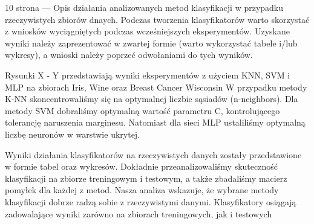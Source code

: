 \documentclass[12pt]{article}
\begin{document}
10 strona --- Opis działania analizowanych metod klasyfikacji w przypadku rzeczywistych zbiorów dnaych. 
Podczas tworzenia klasyfikatorów warto skorzystać z wniosków wyciągniętych podczas wcześniejszych eksperymentów. 
Uzyskane wyniki należy zaprezentować w zwartej formie (warto wykorzystać tabele i/lub wykresy), 
a wnioski należy poprzeć odwołaniami do tych wyników.

Rysunki X - Y przedstawiają wyniki eksperymentów z użyciem KNN, SVM i MLP na zbiorach Iris, Wine oraz Breast Cancer Wisconsin
W przypadku metody K-NN skoncentrowaliśmy się na optymalnej liczbie sąsiadów (n-neighbors). Dla metody SVM dobraliśmy optymalną 
wartość parametru C, kontrolującego tolerancję naruszenia marginesu. Natomiast dla sieci MLP ustaliliśmy optymalną liczbę neuronów 
w warstwie ukrytej.

Wyniki działania klasyfikatorów na rzeczywistych danych zostały przedstawione w formie tabel oraz wykresów. 
Dokładnie przeanalizowaliśmy 
skuteczność klasyfikacji na zbiorze treningowym i testowym, a także zbadaliśmy macierz pomyłek dla każdej z metod. Nasza analiza wskazuje, 
że wybrane metody klasyfikacji dobrze radzą sobie z rzeczywistymi danymi. Klasyfikatory osiągają zadowalające wyniki zarówno na zbiorach 
treningowych, jak i testowych
\end{document}
